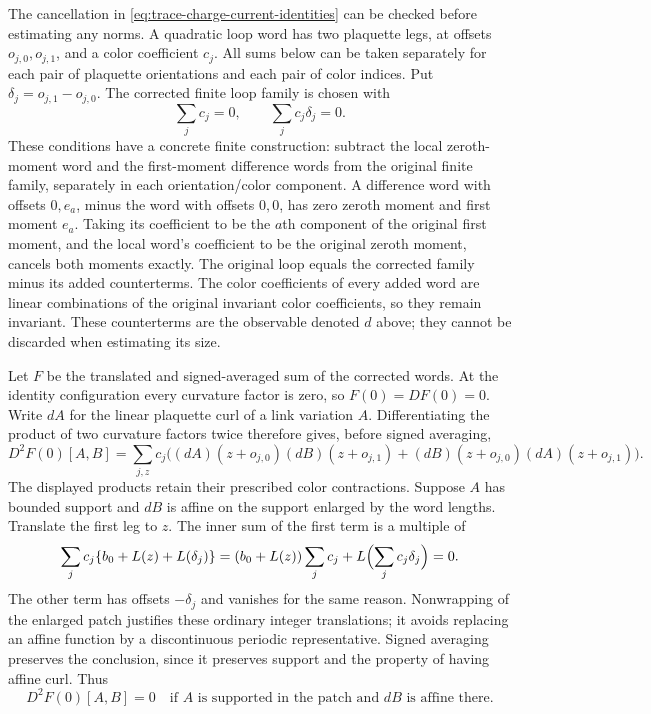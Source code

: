 The cancellation in \eqref{eq:trace-charge-current-identities} can be
checked before estimating any norms. A quadratic loop word has two
plaquette legs, at offsets $o_{j,0},o_{j,1}$, and a color coefficient
$c_j$. All sums below can be taken separately for each pair of plaquette
orientations and each pair of color indices. Put
$\delta_j=o_{j,1}-o_{j,0}$. The corrected finite loop family is chosen with
\begin{equation}
 \sum_jc_j=0,\qquad \sum_jc_j\delta_j=0.
 \label{eq:trace-charge-loop-moments}
\end{equation}
These conditions have a concrete finite construction: subtract the local
zeroth-moment word and the first-moment difference words from the original
finite family, separately in each orientation/color component. A difference
word with offsets $0,e_a$, minus the word with offsets $0,0$, has zero
zeroth moment and first moment $e_a$. Taking its coefficient to be the
$a$th component of the original first moment, and the local word's
coefficient to be the original zeroth moment, cancels both moments
exactly. The original loop equals the corrected family minus its added
counterterms. The color coefficients of every added word are linear combinations of
the original invariant color coefficients, so they remain invariant.
These counterterms are the observable denoted $d$ above;
they cannot be discarded when estimating its size.

Let $F$ be the translated and signed-averaged sum of the corrected words.
At the identity configuration every curvature factor is zero, so
$F(0)=DF(0)=0$. Write $dA$ for the linear plaquette curl of a link
variation $A$. Differentiating the product of two curvature factors twice
therefore gives, before signed averaging,
\[
 D^2F(0)[A,B]=\sum_{j,z}c_j\bigl(
 (dA)(z+o_{j,0})(dB)(z+o_{j,1})
 +(dB)(z+o_{j,0})(dA)(z+o_{j,1})\bigr).
\]
The displayed products retain their prescribed color contractions.
Suppose $A$ has bounded support and $dB$ is affine on the support enlarged
by the word lengths. Translate the first leg to $z$. The inner sum of
the first term is a multiple of
\[
 \sum_jc_j\{b_0+L(z)+L(\delta_j)\}
 =(b_0+L(z))\sum_jc_j+L\Bigl(\sum_jc_j\delta_j\Bigr)=0.
\]
The other term has offsets $-\delta_j$ and vanishes for the same reason.
Nonwrapping of the enlarged patch justifies these ordinary integer
translations; it avoids replacing an affine function by a discontinuous
periodic representative. Signed averaging preserves the conclusion, since
it preserves support and the property of having affine curl. Thus
\begin{equation}
 D^2F(0)[A,B]=0
 \quad\text{if $A$ is supported in the patch and $dB$ is affine there.}
 \label{eq:trace-charge-loop-hessian}
\end{equation}

